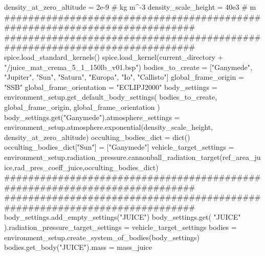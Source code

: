 {}
\markdownRendererSectionEnd \markdownRendererSectionBegin
{}\markdownRendererInterblockSeparator
{}density_at_zero_altitude = 2e-9 # kg m^-3 density_scale_height = 40e3 # m\markdownRendererInterblockSeparator
{}###########################################################################\markdownRendererInterblockSeparator
{}
\markdownRendererSectionEnd \markdownRendererSectionBegin
{}\markdownRendererInterblockSeparator
{}###########################################################################\markdownRendererInterblockSeparator
{}
\markdownRendererSectionEnd \markdownRendererSectionBegin
{}\markdownRendererInterblockSeparator
{}spice.load_standard_kernels() spice.load_kernel(current_directory + "/juice_mat_crema_5_1_150lb_v01.bsp")\markdownRendererInterblockSeparator
{}
\markdownRendererSectionEnd \markdownRendererSectionBegin
{}\markdownRendererInterblockSeparator
{}bodies_to_create = ["Ganymede", "Jupiter", "Sun", "Saturn", "Europa", "Io", "Callisto"] global_frame_origin = "SSB" global_frame_orientation = "ECLIPJ2000" body_settings = environment_setup.get_default_body_settings( bodies_to_create, global_frame_origin, global_frame_orientation ) body_settings.get("Ganymede").atmosphere_settings = environment_setup.atmosphere.exponential(density_scale_height, density_at_zero_altitude) occulting_bodies_dict = dict() occulting_bodies_dict["Sun"] = ["Ganymede"] vehicle_target_settings = environment_setup.radiation_pressure.cannonball_radiation_target(ref_area_juice,rad_pres_coeff_juice,occulting_bodies_dict)\markdownRendererInterblockSeparator
{}###########################################################################\markdownRendererInterblockSeparator
{}
\markdownRendererSectionEnd \markdownRendererSectionBegin
{}\markdownRendererInterblockSeparator
{}########################################################################### body_settings.add_empty_settings("JUICE") body_settings.get( "JUICE" ).radiation_pressure_target_settings = vehicle_target_settings\markdownRendererInterblockSeparator
{}
\markdownRendererSectionEnd \markdownRendererSectionBegin
{}\markdownRendererInterblockSeparator
{}bodies = environment_setup.create_system_of_bodies(body_settings) bodies.get_body("JUICE").mass = mass_juice\markdownRendererInterblockSeparator
{}
\markdownRendererSectionEnd \markdownRendererSectionBegin
